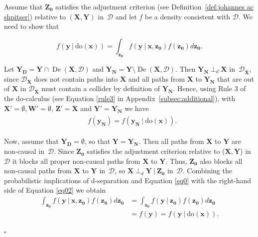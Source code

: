 \documentclass[11pt,a4paper]{article}
\newcommand{\ddo}{\textrm{do}}
\newcommand\given[1][]{\:#1\vert\:}
\newcommand{\dsepp}{\perp_{d}}
\newenvironment{proofof}[1][]{\begin{trivlist}
   \item[\hskip \labelsep {\bfseries Proof of #1.}]}{\hfill{}$\square$\end{trivlist}}
\DeclareMathOperator{\De}{De}
\newcommand{\g}[1][G]{\mathcal{#1}}
\begin{document}
\begin{proofof}[Theorem~\ref{theorem:soundness ac}]
Assume that $\mathbf{Z_0}$ satisfies the adjustment criterion (see Definition~\ref{def:johannes ac shpitser}) relative to $(\mathbf{X,Y})$ in~$\g[D]$ and let $f$ be a density consistent with $\g[D]$.
We need to show that

\begin{equation}
f(\mathbf{y} \given \ddo(\mathbf{x})) = \int_{\mathbf{z_0}} f( \mathbf{y} \given \mathbf{x,}\mathbf{z_0}) f(\mathbf{z_0})d\mathbf{z_0}.
\label{eq02}
\end{equation}

Let $\mathbf{Y_D} = \mathbf{Y} \cap \De(\mathbf{X},\g[D])$ and $\mathbf{Y_N} = \mathbf{Y} \setminus \De(\mathbf{X}, \g[D])$.
Then $\mathbf{Y_N} \dsepp \mathbf{X}$ in~$\g[D]_{\overline{\mathbf{X}}}$, since $\g[D]_{\overline{\mathbf{X}}}$ does not contain paths into $\mathbf{X}$ and all paths from $\mathbf{X}$ to $\mathbf{Y_N}$ that are out of $\mathbf{X}$ in $\g[D]_{\overline{\mathbf{X}}}$ must contain a collider by definition of $\mathbf{Y_N}$. 
Hence, using Rule 3 of the do-calculus (see Equation \ref{rule3} in Appendix~\ref{subsec:additional}), with $\mathbf{X'} = \emptyset, \mathbf{W'} = \emptyset$, $\mathbf{Z'} = \mathbf{X}$ and $\mathbf{Y'} = \mathbf{Y_N}$ we have
\begin{align}
\begin{split}
&f(\mathbf{y_N}) = f(\mathbf{y_N} \given \ddo(\mathbf{x})). \label{eq0}
\end{split}
\end{align}

Now, assume that $\mathbf{Y_D} = \emptyset$, so that $\mathbf{Y} = \mathbf{Y_N}$. Then all paths from $\mathbf{X}$ to $\mathbf{Y}$ are non-causal in~$\g[D]$.
Since $\mathbf{Z_0}$ satisfies the adjustment criterion relative to ($\mathbf{X,Y}$) in~$\g[D]$ it blocks all proper non-causal paths from $\mathbf{X}$ to $\mathbf{Y}$. Thus, $\mathbf{Z_0}$ also blocks all non-causal paths from $\mathbf{X}$ to $\mathbf{Y}$ in~$\g[D]$, so $\mathbf{X} \dsepp \mathbf{Y} \given \mathbf{Z_0}$ in~$\g[D]$.
Combining the probabilistic implications of d-separation and Equation \eqref{eq0} with the right-hand side of Equation \eqref{eq02} we obtain
\begin{align}
\int_{\mathbf{z_0}} f(\mathbf{y} \given \mathbf{x,z_0}) f(\mathbf{z_0})d\mathbf{z_0} &= \int_{\mathbf{z_0}} f(\mathbf{y} \given \mathbf{z_0}) f(\mathbf{z_0})d\mathbf{z_0}  \\ \nonumber
&= f(\mathbf{y}) = f(\mathbf{y} \given \ddo(\mathbf{x})). \nonumber
\end{align}


\end{proofof}
\end{document}
